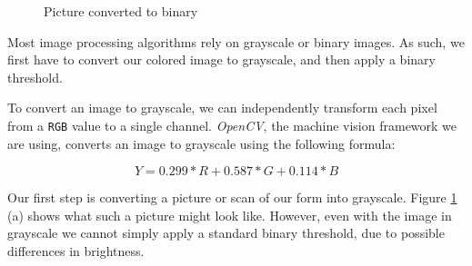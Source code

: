 \documentclass[12pt, a4paper]{report}
\def\code#1{\texttt{#1}}
\begin{document}
\begin{figure}[!h]
\hfill
{}
{}
\hfill
\caption{Picture converted to binary}
\label{original-vs-processed-image}
\end{figure}

Most image processing algorithms rely on grayscale or binary images. As such, we first have to convert our colored image to grayscale, and then apply a binary threshold.

To convert an image to grayscale, we can independently transform each pixel from a \code{RGB} value to a single channel. \textit{OpenCV}, the machine vision framework we are using, converts an image to grayscale using the following formula\cite{opencv-color-convention}:

$$Y = 0.299*R+0.587*G+0.114*B$$

Our first step is converting a picture or scan of our form into grayscale. Figure \ref{original-vs-processed-image} (a) shows what such a picture might look like. However, even with the image in grayscale we cannot simply apply a standard binary threshold, due to possible differences in brightness.
\end{document}
